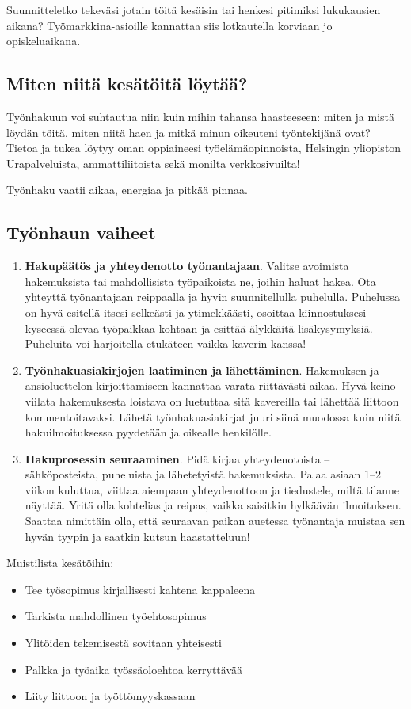 \documentclass[a5paper, 8pt, twocolumn]{book} %
\numberwithin{equation}{section}
\begin{document}
Suunnitteletko tekeväsi jotain töitä kesäisin
tai henkesi pitimiksi lukukausien aikana?
Työmarkkina-asioille kannattaa siis
lotkautella korviaan jo opiskeluaikana.
\subsection*{Miten niitä kesätöitä löytää?}
Työnhakuun voi suhtautua niin kuin
mihin tahansa haasteeseen: miten ja mistä
löydän töitä, miten niitä haen ja mitkä
minun oikeuteni työntekijänä ovat? Tietoa
ja tukea löytyy oman oppiaineesi työelämäopinnoista,
Helsingin yliopiston Urapalveluista,
ammattiliitoista sekä monilta
verkkosivuilta!

Työnhaku vaatii aikaa, energiaa ja pitkää
pinnaa.
\subsection*{Työnhaun vaiheet}
\begin{enumerate}
	\item \textbf{Hakupäätös ja yhteydenotto
	työnantajaan}.
	Valitse avoimista hakemuksista tai mahdollisista
	työpaikoista ne, joihin haluat hakea.
	Ota yhteyttä työnantajaan reippaalla ja
	hyvin suunnitellulla puhelulla. Puhelussa on hyvä esitellä itsesi selkeästi ja ytimekkäästi,
	osoittaa kiinnostuksesi kyseessä
	olevaa työpaikkaa kohtaan ja esittää älykkäitä
	lisäkysymyksiä. Puheluita voi harjoitella
	etukäteen vaikka kaverin kanssa!
	\item \textbf{Työnhakuasiakirjojen laatiminen
	ja lähettäminen}.
	Hakemuksen ja ansioluettelon kirjoittamiseen
	kannattaa varata riittävästi aikaa.
	Hyvä keino viilata hakemuksesta loistava
	on luetuttaa sitä kavereilla tai lähettää liittoon
	kommentoitavaksi. Lähetä työnhakuasiakirjat
	juuri siinä muodossa kuin niitä
	hakuilmoituksessa pyydetään ja oikealle
	henkilölle.
	\item \textbf{Hakuprosessin seuraaminen}.
	Pidä kirjaa yhteydenotoista -- sähköposteista,
	puheluista ja lähetetyistä hakemuksista.
	Palaa asiaan 1--2 viikon kuluttua, viittaa
	aiempaan yhteydenottoon ja tiedustele,
	miltä tilanne näyttää. Yritä olla kohtelias ja
	reipas, vaikka saisitkin hylkäävän ilmoituksen.
	Saattaa nimittäin olla, että seuraavan
	paikan auetessa työnantaja muistaa sen
	hyvän tyypin ja saatkin kutsun haastatteluun!
\end{enumerate} 
Muistilista kesätöihin:
\begin{itemize}
	\item Tee työsopimus kirjallisesti kahtena
kappaleena
\item Tarkista mahdollinen työ\-ehto\-sopimus
\item Ylitöiden tekemisestä sovitaan yhteisesti
\item Palkka ja työaika työssä\-olo\-ehtoa kerryttävää
\item Liity liittoon ja työttömyys\-kassaan
\end{itemize}
\end{document}
